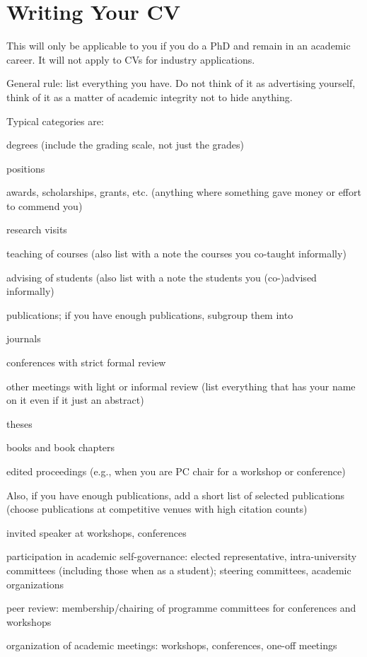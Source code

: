 \documentclass[12pt]{article}
\begin{document}
\section{Writing Your CV}

This will only be applicable to you if you do a PhD and remain in an academic career.
It will not apply to CVs for industry applications.

General rule: list everything you have.
Do not think of it as advertising yourself, think of it as a matter of academic integrity not to hide anything.

Typical categories are:
\begin{compactitem}
 \item degrees (include the grading scale, not just the grades)
 \item positions
 \item awards, scholarships, grants, etc. (anything where something gave money or effort to commend you)
 \item research visits
 \item teaching of courses (also list with a note the courses you co-taught informally)
 \item advising of students (also list with a note the students you (co-)advised informally) 
 \item publications; if you have enough publications, subgroup them into
  \begin{compactitem}
   \item journals
   \item conferences with strict formal review
   \item other meetings with light or informal review (list everything that has your name on it even if it just an abstract)
   \item theses
   \item books and book chapters
   \item edited proceedings (e.g., when you are PC chair for a workshop or conference)
  \end{compactitem}
  Also, if you have enough publications, add a short list of selected publications (choose publications at competitive venues with high citation counts)
 \item invited speaker at workshops, conferences
 \item participation in academic self-governance: elected representative, intra-university committees (including those when as a student); steering committees, academic organizations
 \item peer review: membership/chairing of programme committees for conferences and workshops
 \item organization of academic meetings: workshops, conferences, one-off meetings
\end{compactitem}
\end{document}
